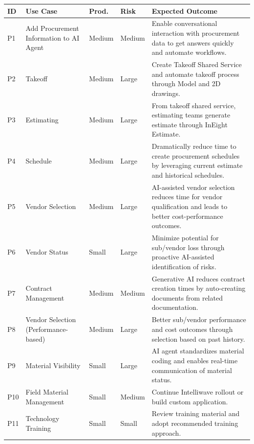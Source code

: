 \documentclass[11pt, letterpaper]{article}
\begin{document}
{\footnotesize
\setlength{\tabcolsep}{4pt}
\begin{tabularx}{\textwidth}{@{} >{\raggedright\arraybackslash}p{0.9cm} >{\raggedright\arraybackslash}p{3.8cm} >{\raggedright\arraybackslash}p{1.3cm} >{\raggedright\arraybackslash}p{1.3cm} X @{}}
\toprule
\textbf{ID} & \textbf{Use Case} & \textbf{Prod.} & \textbf{Risk} & \textbf{Expected Outcome} \\
\midrule
P1 & Add Procurement Information to AI Agent & Medium & Medium & Enable conversational interaction with procurement data to get answers quickly and automate workflows. \\
\midrule
P2 & Takeoff & Medium & Large & Create Takeoff Shared Service and automate takeoff process through Model and 2D drawings. \\
\midrule
P3 & Estimating & Medium & Large & From takeoff shared service, estimating teams generate estimate through InEight Estimate. \\
\midrule
P4 & Schedule & Medium & Large & Dramatically reduce time to create procurement schedules by leveraging current estimate and historical schedules. \\
\midrule
P5 & Vendor Selection & Medium & Large & AI-assisted vendor selection reduces time for vendor qualification and leads to better cost-performance outcomes. \\
\midrule
P6 & Vendor Status & Small & Large & Minimize potential for sub/vendor loss through proactive AI-assisted identification of risks. \\
\midrule
P7 & Contract Management & Medium & Medium & Generative AI reduces contract creation times by auto-creating documents from related documentation. \\
\midrule
P8 & Vendor Selection (Performance-based) & Medium & Large & Better sub/vendor performance and cost outcomes through selection based on past history. \\
\midrule
P9 & Material Visibility & Small & Large & AI agent standardizes material coding and enables real-time communication of material status. \\
\midrule
P10 & Field Material Management & Small & Medium & Continue Intelliwave rollout or build custom application. \\
\midrule
P11 & Technology Training & Small & Small & Review training material and adopt recommended training approach. \\
\bottomrule
\end{tabularx}
}
\end{document}
